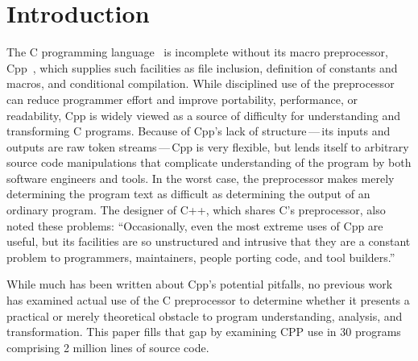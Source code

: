 \documentclass[10pt]{article}
\def\numpackages{30}
\def\numlines{2 million}
\begin{document}
\bigskip

\section{Introduction}

The C programming language~\cite{ansi} is incomplete without its macro
preprocessor, Cpp~\cite[Ch.~3]{Harbison91}, which supplies such facilities
as file inclusion, definition of constants and macros, and conditional
compilation.  While disciplined use of the preprocessor can reduce
programmer effort and improve portability, performance, or readability, Cpp
is widely viewed as a source of difficulty for understanding and
transforming C programs.  Because of Cpp's lack of structure\,---\,its
inputs and outputs are raw token streams\,---\,Cpp is very flexible, but
lends itself to arbitrary source code manipulations that complicate
understanding of the program by both software engineers and tools.  In the
worst case, the preprocessor makes merely determining the program text as
difficult as determining the output of an ordinary program.  The designer
of C++, which shares C's preprocessor, also noted these problems:
``Occasionally, even the most extreme uses of Cpp are useful, but its
facilities are so unstructured and intrusive that they are a constant
problem to programmers, maintainers, people porting code, and tool
builders.''~\cite[p.~424]{Stroustrup-DesignEvolution}

While much has been written about Cpp's potential pitfalls, no previous
work has examined actual use of the C preprocessor to determine whether it
presents a practical or merely theoretical obstacle to program
understanding, analysis, and transformation.  This paper fills that gap by
examining CPP use in {\numpackages} programs comprising {\numlines} lines
of source code.
\end{document}

